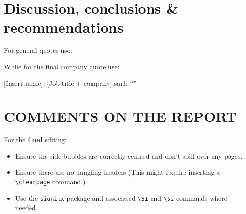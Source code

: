 \documentclass[english,a4paper,oneside,9pt]{extarticle}
\begin{document}
\blindmathpaper

\section{Discussion, conclusions \& recommendations}

For general quotes use:
\begin{myquote}
\lipsum[66]
\end{myquote}

While for the final company quote use:

[Insert name], [Job title + company] said: ``\emph{}''

\begin{small}

\end{small}

\section{COMMENTS ON THE REPORT}
For the \textbf{final} editing:
\begin{itemize}
    \item Ensure the side bubbles are correctly centred and don't spill over any pages. 
    \item Ensure there are no dangling headers (This might require inserting a \verb|\clearpage| command.)
    \item Use the \verb|siunitx| package and associated \verb|\SI| and \verb|\si| commands where needed. 
\end{itemize}

\clearpage
\end{document}
